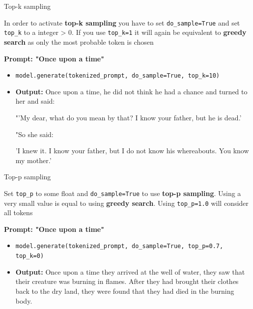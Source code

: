 \begin{vbframe}{Top-k sampling}

\vfill

In order to activate \textbf{top-k sampling} you have to set \texttt{do\_sample=True} and set \texttt{top\_k} to a integer > 0. If you use \texttt{top\_k=1} it will again be equivalent to \textbf{greedy search} as only the most probable token is chosen

\textbf{Prompt: "Once upon a time"}

\begin{itemize}
    \item \texttt{model.generate(tokenized\_prompt, do\_sample=True, top\_k=10)}
    \item \textbf{Output:} Once upon a time, he did not think he had a chance and turned to her and said:

"'My dear, what do you mean by that? I know your father, but he is dead.'

"So she said:

'I knew it. I know your father, but I do not know his whereabouts. You know my mother.'
\end{itemize}

\vfill

\end{vbframe}


\begin{vbframe}{Top-p sampling}

\vfill

Set \texttt{top\_p} to some float and \texttt{do\_sample=True} to use \textbf{top-p sampling}. Using a very small value is equal to using \textbf{greedy search}. Using \texttt{top\_p=1.0} will consider all tokens

\textbf{Prompt: "Once upon a time"}

\begin{itemize}
    \item \texttt{model.generate(tokenized\_prompt, do\_sample=True, top\_p=0.7, top\_k=0)}
    \item \textbf{Output:} Once upon a time they arrived at the well of water, they saw that their creature was burning in flames. After they had brought their clothes back to the dry land, they were found that they had died in the burning body.
\end{itemize}

\vfill
    
\end{vbframe}

